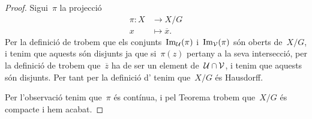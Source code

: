 \documentclass[../topologia.tex]{subfiles}
\begin{document}
\begin{proof}
        Sigui~\(\pi\) la projecció
        \begin{align*}
            \pi\colon X&\longrightarrow X/G \\
            x&\longmapsto\overline{x}.
        \end{align*}
        Per la definició de  trobem que els conjunts~\(\operatorname{Im}_{\mathcal{U}}(\pi)\) i~\(\operatorname{Im}_{\mathcal{V}}(\pi)\) són oberts de~\(X/G\), i tenim que aquests són disjunts ja que si~\(\pi(z)\) pertany a la seva intersecció, per la definició de  trobem que~\(\overline{z}\) ha de ser un element de~\(\mathcal{U}\cap\mathcal{V}\), i tenim que aquests són disjunts.
        Per tant per la definició d' tenim que~\(X/G\) és Hausdorff.

        Per l'observació  tenim que~\(\pi\) és contínua, i pel Teorema  trobem que~\(X/G\) és compacte i hem acabat.
    \end{proof}
\end{document}
